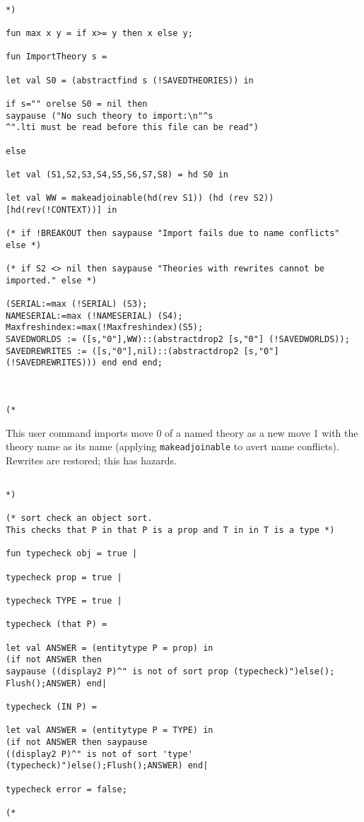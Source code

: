 \documentclass{article}
\begin{document}
\begin{verbatim}

*)

fun max x y = if x>= y then x else y;

fun ImportTheory s = 

let val S0 = (abstractfind s (!SAVEDTHEORIES)) in

if s="" orelse S0 = nil then 
saypause ("No such theory to import:\n"^s
^".lti must be read before this file can be read")

else 

let val (S1,S2,S3,S4,S5,S6,S7,S8) = hd S0 in

let val WW = makeadjoinable(hd(rev S1)) (hd (rev S2)) [hd(rev(!CONTEXT))] in

(* if !BREAKOUT then saypause "Import fails due to name conflicts" else *)

(* if S2 <> nil then saypause "Theories with rewrites cannot be imported." else *)

(SERIAL:=max (!SERIAL) (S3);
NAMESERIAL:=max (!NAMESERIAL) (S4);
Maxfreshindex:=max(!Maxfreshindex)(S5);
SAVEDWORLDS := ([s,"0"],WW)::(abstractdrop2 [s,"0"] (!SAVEDWORLDS));
SAVEDREWRITES := ([s,"0"],nil)::(abstractdrop2 [s,"0"] (!SAVEDREWRITES))) end end end;



(*

\end{verbatim}

This user command imports move 0 of a named theory as a new move 1 with the theory name as its name (applying {\tt makeadjoinable} to avert name conflicts).  Rewrites are restored; this has hazards.


\begin{verbatim}

*)

(* sort check an object sort.  
This checks that P in that P is a prop and T in in T is a type *)

fun typecheck obj = true |

typecheck prop = true |

typecheck TYPE = true |

typecheck (that P) =

let val ANSWER = (entitytype P = prop) in
(if not ANSWER then 
saypause ((display2 P)^" is not of sort prop (typecheck)")else();
Flush();ANSWER) end|

typecheck (IN P) =

let val ANSWER = (entitytype P = TYPE) in
(if not ANSWER then saypause 
((display2 P)^" is not of sort 'type' (typecheck)")else();Flush();ANSWER) end|

typecheck error = false;

(*

\end{verbatim}
\end{document}
